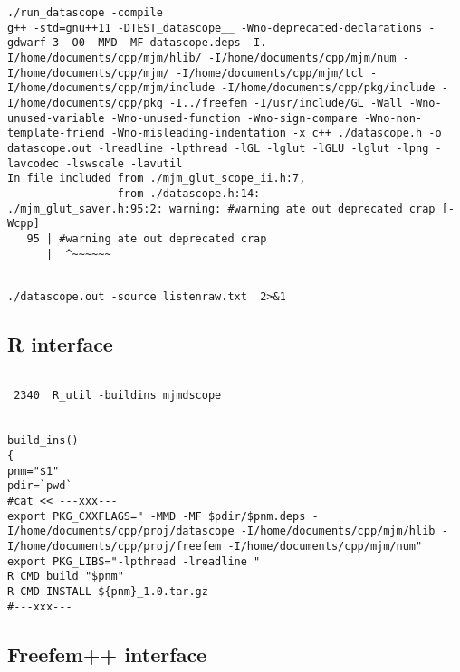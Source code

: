 \documentclass[aps,secnumarabic,balancelastpage,amsmath,amssymb,nofootinbib]{revtex4}
\begin{document}
\begin{lstlisting}
./run_datascope -compile
g++ -std=gnu++11 -DTEST_datascope__ -Wno-deprecated-declarations -gdwarf-3 -O0 -MMD -MF datascope.deps -I. -I/home/documents/cpp/mjm/hlib/ -I/home/documents/cpp/mjm/num -I/home/documents/cpp/mjm/ -I/home/documents/cpp/mjm/tcl -I/home/documents/cpp/mjm/include -I/home/documents/cpp/pkg/include -I/home/documents/cpp/pkg -I../freefem -I/usr/include/GL -Wall -Wno-unused-variable -Wno-unused-function -Wno-sign-compare -Wno-non-template-friend -Wno-misleading-indentation -x c++ ./datascope.h -o datascope.out -lreadline -lpthread -lGL -lglut -lGLU -lglut -lpng -lavcodec -lswscale -lavutil
In file included from ./mjm_glut_scope_ii.h:7,
                 from ./datascope.h:14:
./mjm_glut_saver.h:95:2: warning: #warning ate out deprecated crap [-Wcpp]
   95 | #warning ate out deprecated crap
      |  ^~~~~~~


\end{lstlisting}



\begin{lstlisting}
./datascope.out -source listenraw.txt  2>&1 
\end{lstlisting}


\subsection{ R interface  }


\begin{lstlisting}

 2340  R_util -buildins mjmdscope


build_ins()
{
pnm="$1"
pdir=`pwd`
#cat << ---xxx---
export PKG_CXXFLAGS=" -MMD -MF $pdir/$pnm.deps -I/home/documents/cpp/proj/datascope -I/home/documents/cpp/mjm/hlib -I/home/documents/cpp/proj/freefem -I/home/documents/cpp/mjm/num"
export PKG_LIBS="-lpthread -lreadline "
R CMD build "$pnm"
R CMD INSTALL ${pnm}_1.0.tar.gz
#---xxx---

\end{lstlisting}

\subsection{ Freefem++ interface }
\end{document}
